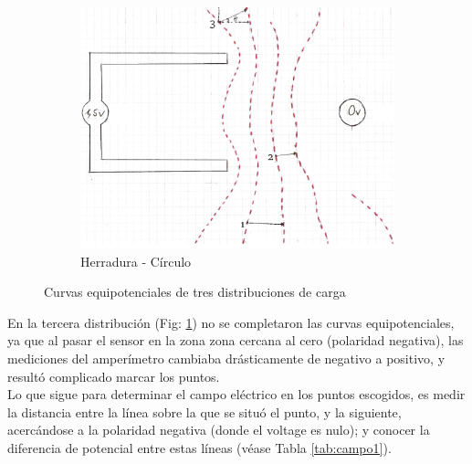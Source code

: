 \documentclass[10pt,twocolumn]{article}
\begin{document}
\begin{figure}[H]
  \vspace{8mm}
  \begin{subfigure}[b]{0.80\linewidth}
    \includegraphics[width=\textwidth]{herradura_es.png}
    \caption{Herradura - Círculo}\label{fig:herradura}
  \end{subfigure}
  \caption{Curvas equipotenciales de tres distribuciones de carga}\label{fig:curvas}
\end{figure}
En la tercera distribución (Fig: \ref{fig:herradura}) no se completaron las curvas equipotenciales, ya que al pasar el sensor en la zona zona cercana al cero (polaridad negativa), las mediciones del amperímetro cambiaba drásticamente de negativo a positivo, y resultó complicado marcar los puntos.\\

  Lo que sigue para determinar el campo eléctrico en los puntos escogidos, es medir la distancia entre la línea sobre la que se situó el punto, y la siguiente, acercándose a la polaridad negativa (donde el voltage es nulo); y conocer la diferencia de potencial entre estas líneas (véase Tabla \ref{tab:campo1}).
\end{document}
